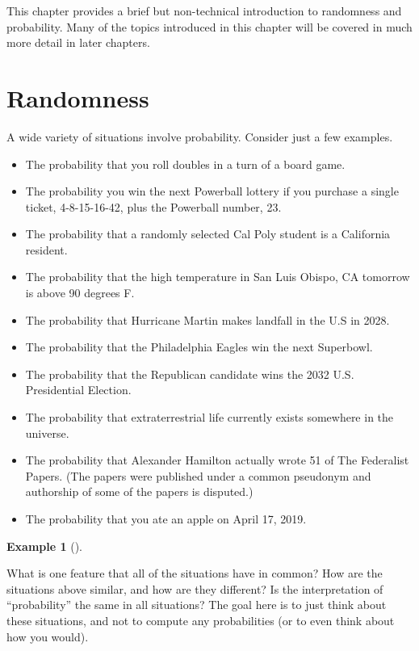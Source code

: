 \documentclass[
  letterpaper,
  DIV=11,
  numbers=noendperiod]{scrreprt}
\providecommand{\tightlist}{%
  \setlength{\itemsep}{0pt}\setlength{\parskip}{0pt}}
\theoremstyle{plain}
\theoremstyle{definition}
\newtheorem{example}{Example}[chapter]
\theoremstyle{definition}
\theoremstyle{definition}
\theoremstyle{remark}
\begin{document}
This chapter provides a brief but non-technical introduction to
randomness and probability. Many of the topics introduced in this
chapter will be covered in much more detail in later chapters.

\section{Randomness}\label{sec-randomness}

A wide variety of situations involve probability. Consider just a few
examples.

\begin{itemize}
\tightlist
\item
  The probability that you roll doubles in a turn of a board game.
\item
  The probability you win the next Powerball lottery if you purchase a
  single ticket, 4-8-15-16-42, plus the Powerball number, 23.
\item
  The probability that a randomly selected Cal Poly student is a
  California resident.
\item
  The probability that the high temperature in San Luis Obispo, CA
  tomorrow is above 90 degrees F.
\item
  The probability that Hurricane Martin makes landfall in the U.S in
  2028.
\item
  The probability that the Philadelphia Eagles win the next Superbowl.
\item
  The probability that the Republican candidate wins the 2032 U.S.
  Presidential Election.
\item
  The probability that extraterrestrial life currently exists somewhere
  in the universe.
\item
  The probability that Alexander Hamilton actually wrote 51 of The
  Federalist Papers. (The papers were published under a common pseudonym
  and authorship of some of the papers is disputed.)
\item
  The probability that you ate an apple on April 17, 2019.
\end{itemize}

\begin{tcolorbox}[enhanced jigsaw, opacityback=0, left=2mm, colframe=quarto-callout-note-color-frame, toprule=.15mm, breakable, colback=white, leftrule=.75mm, arc=.35mm, rightrule=.15mm, bottomrule=.15mm]

\begin{example}[]\protect\hypertarget{exm-randomness}{}\label{exm-randomness}

What is one feature that all of the situations have in common? How are
the situations above similar, and how are they different? Is the
interpretation of ``probability'' the same in all situations? The goal
here is to just think about these situations, and not to compute any
probabilities (or to even think about how you would).

\end{example}

\end{tcolorbox}
\end{document}
